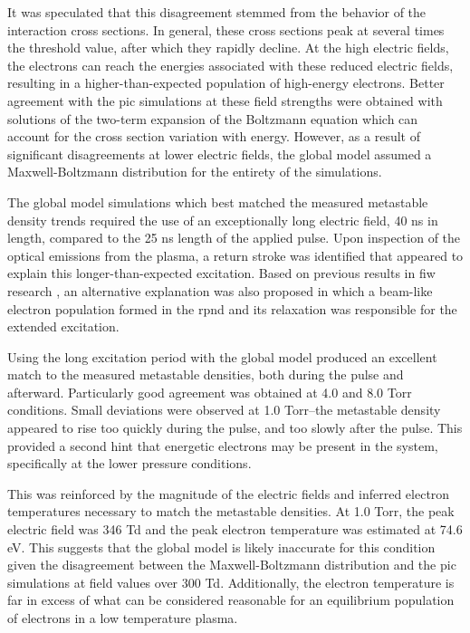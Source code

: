 It was speculated that this disagreement stemmed from the behavior of the
interaction cross sections. In general, these cross sections peak at several
times the threshold value, after which they rapidly decline. At the high
electric fields, the electrons can reach the energies associated with these
reduced electric fields, resulting in a higher-than-expected population of
high-energy electrons. Better agreement with the \acs{pic} simulations at these
field strengths were obtained with solutions of the two-term expansion of the
Boltzmann equation which can account for the cross section variation with
energy. However, as a result of significant disagreements at lower electric
fields, the global model assumed a Maxwell-Boltzmann distribution for the
entirety of the simulations.

The global model simulations which best matched the measured metastable density
trends required the use of an exceptionally long electric field, 40 ns in
length, compared to the 25 ns length of the applied pulse. Upon inspection of
the optical emissions from the plasma, a return stroke was identified that
appeared to explain this longer-than-expected excitation. Based on previous
results in \acs{fiw} research \cite{Starikovskaia1998}, an alternative
explanation was also proposed in which a beam-like electron population formed in
the \acs{rpnd} and its relaxation was responsible for the extended excitation.

Using the long excitation period with the global model produced an excellent
match to the measured metastable densities, both during the pulse and afterward.
Particularly good agreement was obtained at 4.0 and 8.0 Torr conditions. Small
deviations were observed at 1.0 Torr--the metastable density appeared to rise
too quickly during the pulse, and too slowly after the pulse. This provided a
second hint that energetic electrons may be present in the system, specifically
at the lower pressure conditions.

This was reinforced by the magnitude of the electric fields and inferred
electron temperatures necessary to match the metastable densities. At 1.0 Torr,
the peak electric field was 346 Td and the peak electron temperature was
estimated at 74.6 eV. This suggests that the global model is likely inaccurate
for this condition given the disagreement between the Maxwell-Boltzmann
distribution and the \acs{pic} simulations at field values over 300 Td.
Additionally, the electron temperature is far in excess of what can be
considered reasonable for an equilibrium population of electrons in a low
temperature plasma.

